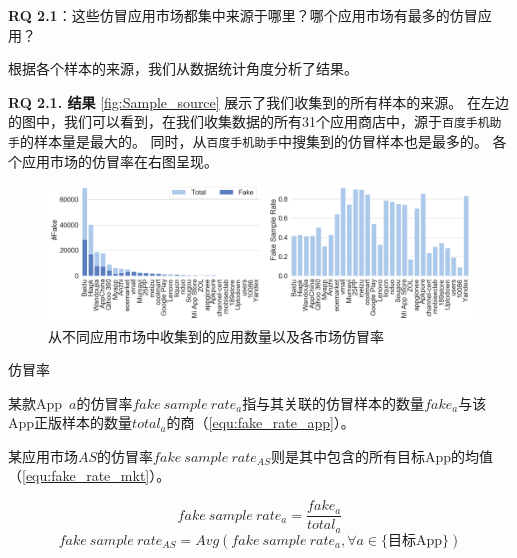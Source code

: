 {\bf RQ 2.1}：这些仿冒应用市场都集中来源于哪里？哪个应用市场有最多的仿冒应用？

根据各个样本的来源，我们从数据统计角度分析了结果。

{\bf RQ 2.1. 结果} \autoref{fig:Sample_source} 展示了我们收集到的所有样本的来源。
在左边的图中，我们可以看到，在我们收集数据的所有31个应用商店中，源于\texttt{百度手机助手}的样本量是最大的。
同时，从\texttt{百度手机助手}中搜集到的仿冒样本也是最多的。
各个应用市场的仿冒率在右图呈现。

\begin{figure}[htbp]
	\centering
  \setlength{\belowcaptionskip}{-10pt}
	\includegraphics[width=\textwidth]{./Figures/edwin-Number_of_samples_collected_markets_3.png}
	\caption{从不同应用市场中收集到的应用数量以及各市场仿冒率}
	\label{fig:Sample_source}
\end{figure}

\begin{Def}
    仿冒率

    某款App~$a$的仿冒率$fake~sample~rate_a$指与其关联的仿冒样本的数量$fake_a$与该App正版样本的数量$total_a$的商（\autoref{equ:fake_rate_app}）。

    某应用市场$AS$的仿冒率$fake~sample~rate_{AS}$则是其中包含的所有目标App的均值（\autoref{equ:fake_rate_mkt}）。
\end{Def}

\begin{equation}
    fake~sample~rate_a = \frac{fake_a}{total_a}
    \label{equ:fake_rate_app}
\end{equation}
\begin{equation}
    fake~sample~rate_{AS} = Avg(fake~sample~rate_a, \forall a \in \text{\{目标App\}})
    \label{equ:fake_rate_mkt}
\end{equation}
\vspace{0.5mm}

